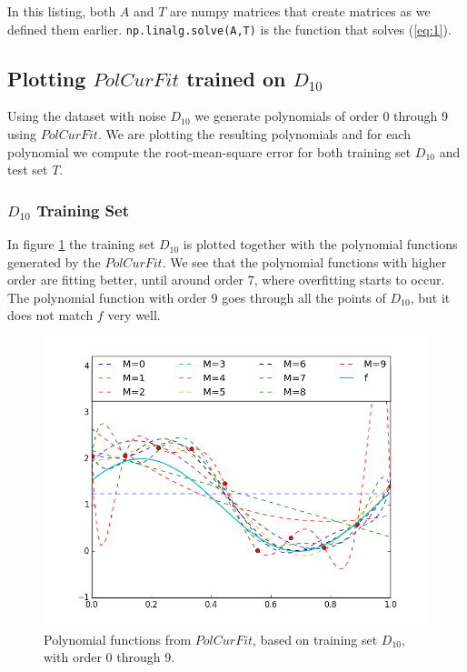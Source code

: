 \documentclass[11pt]{article}
\begin{document}
In this listing, both $A$ and $T$ are numpy matrices that create matrices as we defined them earlier. \texttt{np.linalg.solve(A,T)} is the function that solves (\ref{eq:1}).
\subsection{Plotting $PolCurFit$ trained on $D_{10}$}
\label{sec:d10}
Using the dataset with noise $D_{10}$ we generate polynomials of order 0 through 9 using $PolCurFit$. We are plotting the resulting polynomials and for each polynomial we compute the root-mean-square error for both training set $D_{10}$ and test set $T$.

\subsubsection{$D_{10}$ Training Set}
\label{sec:d10plots}
In figure \ref{fig:d10plots} the training set $D_{10}$ is plotted together with the polynomial functions generated by the $PolCurFit$. We see that the polynomial functions with higher order are fitting better, until around order 7, where overfitting starts to occur. The  polynomial function with order 9 goes through all the points of $D_{10}$, but it does not match $f$ very well.

\begin{figure}[H]
	
	\centering
		\includegraphics[trim={1cm 1cm 0.5cm 0.7cm},clip, scale=0.5]{images/exercise1_3a.png}
		\caption{Polynomial functions from $PolCurFit$, based on training set $D_{10}$, with order 0 through 9. }
	\label{fig:d10plots}
	
\end{figure}
\end{document}
